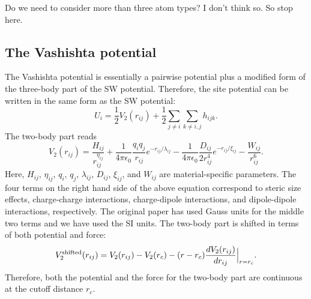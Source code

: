 \documentclass[12pt,a4paper]{report}
\begin{document}
Do we need to consider more than three atom types? I don't think so. So stop here. 


\subsection{The Vashishta potential}

The Vashishta potential \cite{vashishta2007jap} is essentially a pairwise potential plus a modified form of the three-body part of the SW potential. Therefore, the site potential can be written in the same form as the SW potential:
\begin{equation}
U_i = \frac{1}{2} V_2(r_{ij}) + \frac{1}{2}\sum_{j\neq i}\sum_{k\neq i,j} h_{ijk}.
\end{equation}
The two-body part reads
\begin{equation}
V_2(r_{ij}) =  
\frac{H_{ij}}{r_{ij}^{\eta_{ij}}} + 
\frac{1}{4\pi\epsilon_0} \frac{q_{i}q_{j}}{r_{ij}} e^{-r_{ij}/\lambda_{ij}} -
\frac{1}{4\pi\epsilon_0} \frac{D_{ij}}{2r_{ij}^4} e^{-r_{ij}/\xi_{ij}}  -
\frac{W_{ij}}{r_{ij}^6}.
\end{equation}
Here, $H_{ij}$, $\eta_{ij}$, $q_{i}$, $q_{j}$, $\lambda_{ij}$, $D_{ij}$, $\xi_{ij}$, and $W_{ij}$ are material-specific parameters. The four terms on the right hand side of the above equation correspond to steric size effects, charge-charge interactions, charge-dipole interactions, and dipole-dipole interactions, respectively. The original paper \cite{vashishta2007jap} has used Gauss units for the middle two terms and we have used the SI units. The two-body part is shifted in terms of both potential and force:
\begin{equation}
V_2^{\rm shifted}(r_{ij}) = V_2(r_{ij}) - V_2(r_{c}) -(r-r_c) \frac{dV_2(r_{ij})}{dr_{ij}}\Big|_{r=r_c}.
\end{equation}
Therefore, both the potential and the force for the two-body part are continuous at the cutoff distance $r_c$.
\end{document}
